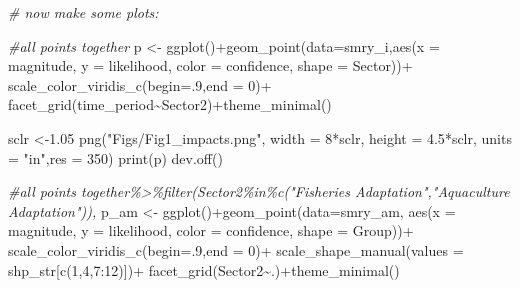 \documentclass[
]{article}
\newenvironment{Shaded}{\begin{snugshade}}{\end{snugshade}}
\newcommand{\AttributeTok}[1]{\textcolor[rgb]{0.77,0.63,0.00}{#1}}
\newcommand{\CommentTok}[1]{\textcolor[rgb]{0.56,0.35,0.01}{\textit{#1}}}
\newcommand{\DecValTok}[1]{\textcolor[rgb]{0.00,0.00,0.81}{#1}}
\newcommand{\FloatTok}[1]{\textcolor[rgb]{0.00,0.00,0.81}{#1}}
\newcommand{\FunctionTok}[1]{\textcolor[rgb]{0.00,0.00,0.00}{#1}}
\newcommand{\NormalTok}[1]{#1}
\newcommand{\OtherTok}[1]{\textcolor[rgb]{0.56,0.35,0.01}{#1}}
\newcommand{\SpecialCharTok}[1]{\textcolor[rgb]{0.00,0.00,0.00}{#1}}
\newcommand{\StringTok}[1]{\textcolor[rgb]{0.31,0.60,0.02}{#1}}
\begin{document}
\begin{Shaded}
\begin{Highlighting}[]
  \CommentTok{\# now make some plots:}
  
    \CommentTok{\#all points together}
\NormalTok{   p }\OtherTok{\textless{}{-}}  \FunctionTok{ggplot}\NormalTok{()}\SpecialCharTok{+}\FunctionTok{geom\_point}\NormalTok{(}\AttributeTok{data=}\NormalTok{smry\_i,}\FunctionTok{aes}\NormalTok{(}\AttributeTok{x     =}\NormalTok{ magnitude,}
                                             \AttributeTok{y     =}\NormalTok{ likelihood,}
                                             \AttributeTok{color =}\NormalTok{ confidence,}
                                             \AttributeTok{shape =}\NormalTok{ Sector))}\SpecialCharTok{+}
      \FunctionTok{scale\_color\_viridis\_c}\NormalTok{(}\AttributeTok{begin=}\NormalTok{.}\DecValTok{9}\NormalTok{,}\AttributeTok{end =} \DecValTok{0}\NormalTok{)}\SpecialCharTok{+}
      \FunctionTok{facet\_grid}\NormalTok{(time\_period}\SpecialCharTok{\textasciitilde{}}\NormalTok{Sector2)}\SpecialCharTok{+}\FunctionTok{theme\_minimal}\NormalTok{()}
     
\NormalTok{    sclr }\OtherTok{\textless{}{-}}\FloatTok{1.05}
    \FunctionTok{png}\NormalTok{(}\StringTok{"Figs/Fig1\_impacts.png"}\NormalTok{, }
        \AttributeTok{width =} \DecValTok{8}\SpecialCharTok{*}\NormalTok{sclr, }\AttributeTok{height =} \FloatTok{4.5}\SpecialCharTok{*}\NormalTok{sclr, }\AttributeTok{units =} \StringTok{"in"}\NormalTok{,}\AttributeTok{res =} \DecValTok{350}\NormalTok{)}
    \FunctionTok{print}\NormalTok{(p)}
    \FunctionTok{dev.off}\NormalTok{()}
    
   
      \CommentTok{\#all points together\%\textgreater{}\%filter(Sector2\%in\%c("Fisheries Adaptation","Aquaculture Adaptation")),}
\NormalTok{   p\_am }\OtherTok{\textless{}{-}}  \FunctionTok{ggplot}\NormalTok{()}\SpecialCharTok{+}\FunctionTok{geom\_point}\NormalTok{(}\AttributeTok{data=}\NormalTok{smry\_am,}
                                \FunctionTok{aes}\NormalTok{(}\AttributeTok{x     =}\NormalTok{ magnitude,}
                                    \AttributeTok{y     =}\NormalTok{ likelihood,}
                                    \AttributeTok{color =}\NormalTok{ confidence,}
                                    \AttributeTok{shape =}\NormalTok{ Group))}\SpecialCharTok{+}
     \FunctionTok{scale\_color\_viridis\_c}\NormalTok{(}\AttributeTok{begin=}\NormalTok{.}\DecValTok{9}\NormalTok{,}\AttributeTok{end =} \DecValTok{0}\NormalTok{)}\SpecialCharTok{+}
     \FunctionTok{scale\_shape\_manual}\NormalTok{(}\AttributeTok{values =}\NormalTok{ shp\_str[}\FunctionTok{c}\NormalTok{(}\DecValTok{1}\NormalTok{,}\DecValTok{4}\NormalTok{,}\DecValTok{7}\SpecialCharTok{:}\DecValTok{12}\NormalTok{)])}\SpecialCharTok{+}
     \FunctionTok{facet\_grid}\NormalTok{(Sector2}\SpecialCharTok{\textasciitilde{}}\NormalTok{.)}\SpecialCharTok{+}\FunctionTok{theme\_minimal}\NormalTok{()}
     

\end{Highlighting}
\end{Shaded}
\end{document}
